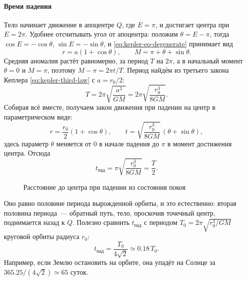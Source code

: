 \paragraph{Время падения} Тело начинает движение в апоцентре $Q$, где $E = \pi$, и достигает центра при $E = 2\pi$. Удобнее отсчитывать угол от апоцентра: положим $\theta = E - \pi$, тогда $\cos E = -\cos\theta$, $\sin E = -\sin\theta$, и \eqref{eq:kepler-eq-degenerate} принимает вид
\begin{equation*}
    r = a (1 + \cos\theta),
    \qquad
    M = \pi + \theta + \sin\theta.
\end{equation*}
Средняя аномалия растёт равномерно, за период $T$ на $2\pi$, а в начальный момент $\theta = 0$ и $M = \pi$, поэтому $M - \pi = 2\pi t / T$. Период найдём из третьего закона Кеплера \eqref{eq:kepler-third-law} с $a = r_0 / 2$:
\begin{equation*}
    T = 2\pi\sqrt{\frac{a^3}{GM}} = 2\pi\sqrt{\frac{r_0^3}{8GM}}.
\end{equation*}
Собирая всё вместе, получаем закон движения при падении на центр в параметрическом виде:
\begin{equation}
    r = \frac{r_0}{2}(1 + \cos\theta),
    \qquad
    t = \sqrt{\frac{r_0^3}{8GM}}\,(\theta + \sin\theta),
    \label{eq:degenerate-fall}
\end{equation}
здесь параметр $\theta$ меняется от $0$ в начале падения до $\pi$ в момент достижения центра. Отсюда 
\begin{equation}
    t_\text{пад} = \pi\sqrt{\frac{r_0^3}{8GM}} = \frac{T}{2}.
    \label{eq:degenerate-fall-time}
\end{equation}
\begin{figure}
    \centering
    \vspace{-0.5pc}
    \caption{Расстояние до центра при падении из состояния покоя}
    \label{pic:degenerate-fall}
\end{figure}
Оно равно половине периода вырожденной орбиты, и это естественно: вторая половина периода~--- обратный путь, тело, проскочив точечный центр, поднимается назад к $Q$. Полезно сравнить $t_\text{пад}$ с периодом $T_0 = 2\pi\sqrt{r_0^3 / GM}$ круговой орбиты радиуса $r_0$:
\begin{equation*}
    t_\text{пад} = \frac{T_0}{4\sqrt{2}} \simeq 0.18\, T_0.
\end{equation*}
Например, если Землю остановить на орбите, она упадёт на Солнце за $365.25 / (4\sqrt{2}) \simeq 65$ суток.


